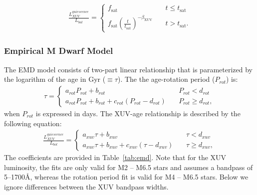 \documentclass[preprint]{aastex631}
\begin{document}
\begin{align}
\label{eq:lxuv}
\frac{L_{XUV}^{quiescence}}{L_{bol}} = \left\{
        \begin{array}{lcr}
            f_\mathrm{sat} &\ & t \leq t_\mathrm{sat} \\
            f_\mathrm{sat}\left(\frac{t}{t_\mathrm{sat}}\right)^{-\beta_\mathrm{XUV}} &\ & t > t_\mathrm{sat}.
        \end{array}
    \right.
\end{align}



\subsubsection{Empirical M Dwarf Model\label{sec:empirical}} 

The EMD model consists of two-part linear relationship that is parameterized by the logarithm of the age in Gyr ($\equiv\tau$). The the age-rotation period ($P_{rot}$) is:
\begin{align}
\tau = \left\{
            \begin{array}{lcr}
                a_{rot}P_{rot} + b_{rot} &\ & P_{rot} < d_{rot} \\
                a_{rot}P_{rot} + b_{rot} + c_{rot}(P_{rot} - d_{rot}) &\ & P_{rot} \geq d_{rot},
        \end{array}
    \right.
    \label{eq:englerot}
\end{align}
when $P_{rot}$ is expressed in days. The XUV-age relationship is described by the following equation:
\begin{align}
\frac{L_{XUV}^{quiescence}}{L_{bol}} = \left\{
            \begin{array}{lcr}
                a_{xuv}\tau + b_{xuv} &\ & \tau < d_{xuv} \\
                a_{xuv}\tau + b_{xuv} + c_{xuv}(\tau - d_{xuv}) &\ & \tau \geq d_{xuv},
        \end{array}
    \right.
    \label{eq:englexuv}
\end{align}
The coefficients are provided in Table~\ref{tab:emd}. Note that for the XUV luminosity, the fits are only valid for M2 -- M6.5 stars and assumes a bandpass of 5--1700\AA, whereas the rotation period fit is valid for M4 -- M6.5 stars. Below we ignore differences between the XUV bandpass widths.

\end{document}
